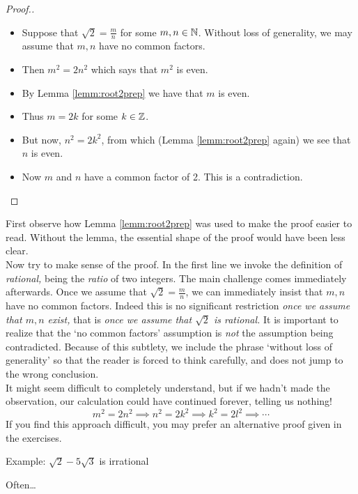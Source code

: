 \begin{proof}[Proof.\hspace{-27pt}]
\begin{itemize}\setlength{\itemsep}{-2pt}
  \item[] Suppose that $\sqrt 2=\frac mn$ for some $m,n\in\mathbb{N}$. Without loss of generality, we may assume that $m,n$ have no common factors.
  \item[] Then $m^2=2n^2$ which says that $m^2$ is even.
  \item[] By Lemma \ref{lemm:root2prep} we have that $m$ is even.
  \item[] Thus $m=2k$ for some $k\in\mathbb{Z}$.
	\item[] But now, $n^2=2k^2$, from which (Lemma \ref{lemm:root2prep} again) we see that $n$ is even.
	\item[] Now $m$ and $n$ have a common factor of 2. This is a contradiction.\qedhere
\end{itemize}
\end{proof}

 First observe how Lemma \ref{lemm:root2prep} was used to make the proof easier to read. Without the lemma, the essential shape of the proof would have been less clear.\\
Now try to make sense of the proof. In the first line we invoke the definition of \emph{rational,} being the \emph{ratio} of two integers. The main challenge comes immediately afterwards. Once we assume that $\sqrt 2=\frac mn$, we can immediately insist that $m,n$ have no common factors. Indeed this is no significant restriction \emph{once we assume that $m,n$ exist,} that is \emph{once we assume that $\sqrt 2$ is rational.} It is important to realize that the `no common factors' assumption is \emph{not} the assumption being contradicted. Because of this subtlety, we include the phrase `without loss of generality' so that the reader is forced to think carefully, and does not jump to the wrong conclusion.\\
It might seem difficult to completely understand, but if we hadn't made the observation, our calculation could have continued forever, telling us nothing!
\[m^2=2n^2\implies n^2=2k^2\implies k^2=2l^2\implies\cdots\]
If you find this approach difficult, you may prefer an alternative proof given in the exercises.


Example: $\sqrt 2-5\sqrt 3$ is irrational


Often\ldots

